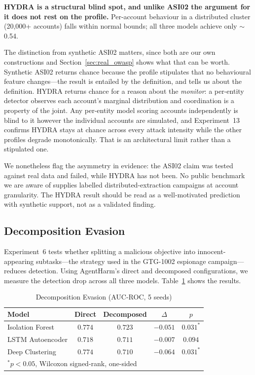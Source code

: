 \documentclass[conference]{IEEEtran}
\begin{document}
\textbf{HYDRA is a structural blind spot, and unlike ASI02 the argument for it does not rest on the profile.} Per-account behaviour in a distributed cluster (20,000+ accounts) falls within normal bounds; all three models achieve only ${\sim}$0.54.

The distinction from synthetic ASI02 matters, since both are our own constructions and Section~\ref{sec:real_owasp} shows what that can be worth. Synthetic ASI02 returns chance because the profile stipulates that no behavioural feature changes---the result is entailed by the definition, and tells us about the definition. HYDRA returns chance for a reason about the \emph{monitor}: a per-entity detector observes each account's marginal distribution and coordination is a property of the joint. Any per-entity model scoring accounts independently is blind to it however the individual accounts are simulated, and Experiment~13 confirms HYDRA stays at chance across every attack intensity while the other profiles degrade monotonically. That is an architectural limit rather than a stipulated one.

We nonetheless flag the asymmetry in evidence: the ASI02 claim was tested against real data and failed, while HYDRA has not been. No public benchmark we are aware of supplies labelled distributed-extraction campaigns at account granularity. The HYDRA result should be read as a well-motivated prediction with synthetic support, not as a validated finding.

\subsection{Decomposition Evasion}
\label{sec:decomposition}

Experiment~6 tests whether splitting a malicious objective into innocent-appearing subtasks---the strategy used in the GTG-1002 espionage campaign---reduces detection. Using AgentHarm's direct and decomposed configurations, we measure the detection drop across all three models. Table~\ref{tab:decomposition} shows the results.

\begin{table}[htbp]
\caption{Decomposition Evasion (AUC-ROC, 5 seeds)}
\label{tab:decomposition}
\centering
\begin{tabular}{lcccc}
\toprule
\textbf{Model} & \textbf{Direct} & \textbf{Decomposed} & \textbf{$\Delta$} & \textbf{$p$} \\
\midrule
Isolation Forest & $0.774$ & $0.723$ & $-0.051$ & $0.031^{*}$ \\
LSTM Autoencoder & $0.718$ & $0.711$ & $-0.007$ & $0.094$ \\
Deep Clustering & $0.774$ & $0.710$ & $-0.064$ & $0.031^{*}$ \\
\bottomrule
\multicolumn{5}{l}{\footnotesize $^{*}p{<}0.05$, Wilcoxon signed-rank, one-sided} \\
\end{tabular}
\end{table}
\end{document}
